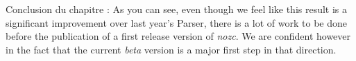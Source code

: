 Conclusion du chapitre :
As you can see, even though we feel like this result is a significant improvement over last year's Parser, there is a lot of work to be done before the publication of a first release version of \textit{nozc}.
We are confident however in the fact that the current \textit{beta} version is a major first step in that direction.